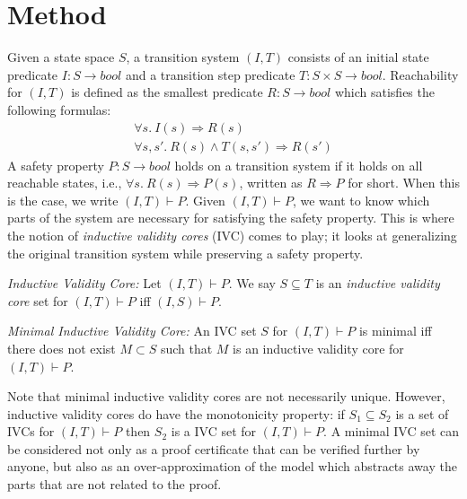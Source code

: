 \section{Method}
\label{sec:method}

\newcommand{\bool}[0]{\mathit{bool}}
\newcommand{\reach}[0]{\mathit{R}}
\newcommand{\ite}[3]{\mathit{if}\ {#1}\ \mathit{then}\ {#2}\ \mathit{else}\ {#3}}


Given a state space $S$, a transition system $(I,T)$ consists of an
initial state predicate $I : S \to \bool$ and a transition step
predicate $T : S \times S \to \bool$. Reachability for $(I, T)$ is defined as the smallest predicate $\reach : S \to \bool$ which satisfies the following formulas:
\begin{gather*}
  \forall s.~ I(s) \Rightarrow \reach(s) \\
  \forall s, s'.~ \reach(s) \land T(s, s') \Rightarrow \reach(s')
\end{gather*}
A safety
property $P : S \to \bool$ holds on a transition system if it holds on all
reachable states, i.e., $\forall s.~ \reach(s) \Rightarrow P(s)$,
written as $\reach \Rightarrow P$ for short. When this is the case, we
write $(I, T)\vdash P$. Given $(I, T)\vdash P$, we
want to know which parts of the system are necessary for satisfying
the safety property. This is where the notion of {\em inductive validity cores} (IVC) comes to play; it looks at generalizing the original transition system while
preserving a safety property.

\begin{definition}{\emph{Inductive Validity Core:}}
  \label{def:ivc}
  Let $(I, T)\vdash P$. We say $S \subseteq
  T$ is an {\em inductive validity core} set for $(I, T)\vdash P$ iff $(I,
  S) \vdash P$.
\end{definition}

\begin{definition}{\emph{Minimal Inductive Validity Core:}}
  \label{def:minimal-ivc}
  An IVC set $S$ for $(I, T)\vdash P$ is minimal iff
  there does not exist $M \subset S$ such that $M$ is an inductive validity core
  for $(I, T)\vdash P$.
\end{definition}

Note that minimal inductive validity cores are not necessarily unique. However, inductive validity cores do have the monotonicity property: if $S_1 \subseteq S_2$ is a set of IVCs for $(I, T)\vdash P$ then $S_2$ is a
  IVC set for $(I, T)\vdash P$. A minimal IVC set can be considered not only as a proof certificate that can be verified further by anyone, but also as an over-approximation of the model which abstracts away the parts that are not related to the proof.
